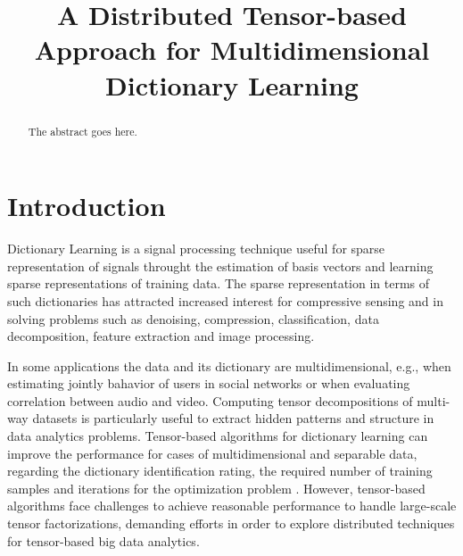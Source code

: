 \documentclass[conference]{IEEEtran}
\begin{document}
\title{A Distributed Tensor-based Approach for Multidimensional Dictionary Learning}


\author{
\and
{}
\and
{}
}


\maketitle


\begin{abstract}
The abstract goes here.
\end{abstract}

\IEEEpeerreviewmaketitle

\section{Introduction}
Dictionary Learning is a signal processing technique useful for sparse representation of signals throught the estimation of basis vectors and learning sparse representations of training data. The sparse representation in terms of such dictionaries has attracted increased interest for compressive sensing and in solving problems such as denoising, compression, classification, data decomposition, feature extraction and image processing.

In some applications the data and its dictionary are multidimensional, e.g., when estimating jointly bahavior of users in social networks or when evaluating correlation between audio and video. Computing tensor decompositions of multi-way datasets is particularly useful to extract hidden patterns and structure in data analytics problems. Tensor-based algorithms for dictionary learning can improve the performance for cases of multidimensional and separable data, regarding the dictionary identification rating, the required number of training samples and iterations for the optimization problem \cite{roemer2014tensor}. However, tensor-based algorithms face challenges to achieve reasonable performance to handle large-scale tensor factorizations, demanding efforts in order to explore distributed techniques for tensor-based big data analytics.
\end{document}

